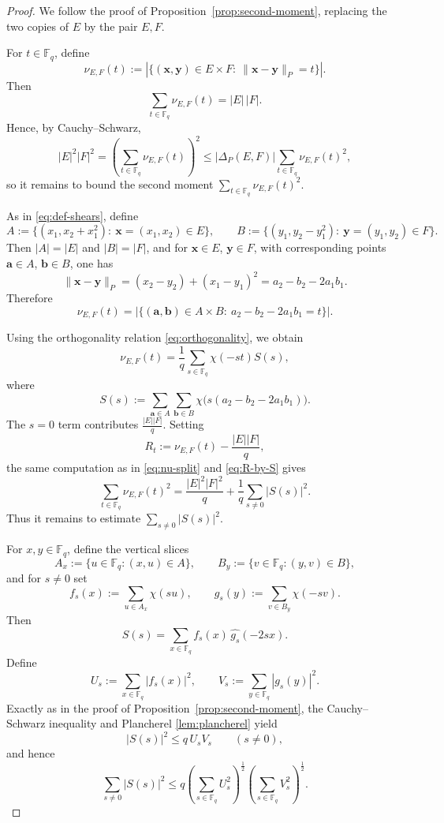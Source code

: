 \documentclass[10pt,a4paper]{amsart}
\newcommand{\F}{\mathbb{F}}
\newcommand{\abs}[1]{\left|#1\right|}
\begin{document}
\begin{proof}
We follow the proof of Proposition~\ref{prop:second-moment}, replacing the two copies of $E$ by the pair $E,F$.

For $t\in \F_q$, define
\[
\nu_{E,F}(t):=
\abs{\{(\mathbf{x},\mathbf{y})\in E\times F:\ \|\mathbf{x}-\mathbf{y}\|_P=t\}}.
\]
Then
\[
\sum_{t\in\F_q}\nu_{E,F}(t)=|E|\,|F|.
\]
Hence, by Cauchy--Schwarz,
\begin{equation}\label{eq:bipartite-CS}
|E|^2|F|^2
=
\left(\sum_{t\in\F_q}\nu_{E,F}(t)\right)^2
\le
\abs{\Delta_P(E,F)}
\sum_{t\in\F_q}\nu_{E,F}(t)^2,
\end{equation}
so it remains to bound the second moment $\sum\limits_{t\in\F_q}\nu_{E,F}(t)^2$.

As in \eqref{eq:def-shears}, define
\[
A:=\{(x_1,x_2+x_1^2):\ \mathbf{x}=(x_1,x_2)\in E\},
\qquad
B:=\{(y_1,y_2-y_1^2):\ \mathbf{y}=(y_1,y_2)\in F\}.
\]
Then $|A|=|E|$ and $|B|=|F|$, and for $\mathbf{x}\in E$, $\mathbf{y}\in F$, with corresponding points
$\mathbf{a}\in A$, $\mathbf{b}\in B$, one has
\[
\|\mathbf{x}-\mathbf{y}\|_P
=
(x_2-y_2)+(x_1-y_1)^2
=
a_2-b_2-2a_1b_1.
\]
Therefore
\[
\nu_{E,F}(t)
=
\abs{\{(\mathbf{a},\mathbf{b})\in A\times B:\ a_2-b_2-2a_1b_1=t\}}.
\]

Using the orthogonality relation \eqref{eq:orthogonality}, we obtain
\[
\nu_{E,F}(t)
=
\frac{1}{q}\sum_{s\in \F_q}\chi(-st)S(s),
\]
where
\[
S(s):=
\sum_{\mathbf{a}\in A}\sum_{\mathbf{b}\in B}
\chi\bigl(s(a_2-b_2-2a_1b_1)\bigr).
\]
The $s=0$ term contributes $\frac{|E| |F|}{q}$. Setting
\[
R_t:=\nu_{E,F}(t)-\frac{|E| |F|}{q},
\]
the same computation as in \eqref{eq:nu-split} and \eqref{eq:R-by-S} gives
\[
\sum_{t\in\F_q}\nu_{E,F}(t)^2
=
\frac{|E|^2|F|^2}{q}
+
\frac{1}{q}\sum_{s\ne 0}|S(s)|^2.
\]
Thus it remains to estimate $\sum\limits_{s\ne 0}|S(s)|^2$.

For $x,y\in\F_q$, define the vertical slices
\[
A_x:=\{u\in\F_q:(x,u)\in A\},
\qquad
B_y:=\{v\in\F_q:(y,v)\in B\},
\]
and for $s\ne 0$ set
\[
f_s(x):=\sum_{u\in A_x}\chi(su),
\qquad
g_s(y):=\sum_{v\in B_y}\chi(-sv).
\]
Then
\[
S(s)=\sum_{x\in\F_q}f_s(x)\,\widehat{g_s}(-2sx).
\]
Define
\[
U_s:=\sum_{x\in\F_q}|f_s(x)|^2,
\qquad
V_s:=\sum_{y\in\F_q}|g_s(y)|^2.
\]
Exactly as in the proof of Proposition~\ref{prop:second-moment}, the Cauchy--Schwarz inequality and Plancherel \eqref{lem:plancherel} yield
\[
|S(s)|^2\le q\,U_sV_s
\qquad (s\ne 0),
\]
and hence
\begin{equation}\label{eq:bipartite-sumS}
\sum_{s\ne 0}|S(s)|^2
\le
q\left(\sum_{s\in\F_q}U_s^2\right)^{\frac{1}{2}}
\left(\sum_{s\in\F_q}V_s^2\right)^{\frac{1}{2}}.
\end{equation}


\end{proof}
\end{document}
